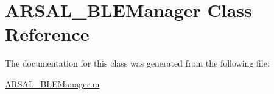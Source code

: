\hypertarget{classARSAL__BLEManager}{}\section{A\+R\+S\+A\+L\+\_\+\+B\+L\+E\+Manager Class Reference}
\label{classARSAL__BLEManager}


The documentation for this class was generated from the following file\+:\begin{DoxyCompactItemize}
\item 
\hyperlink{ARSAL__BLEManager_8m}{A\+R\+S\+A\+L\+\_\+\+B\+L\+E\+Manager.\+m}\end{DoxyCompactItemize}
